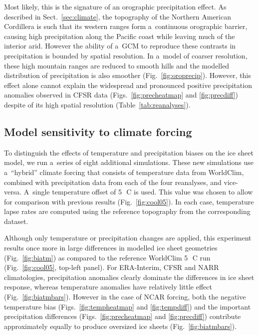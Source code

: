 \documentclass[tc, ms]{copernicus}
\begin{document}
Most likely, this is the signature of an orographic precipitation effect. As described in Sect.~\ref{sec:climate}, the topography of the Northern American Cordillera is such that its western ranges form a~continuous orographic barrier, causing high precipitation along the Pacific coast while leaving much of the interior arid. However the ability of a~GCM to reproduce these contrasts in precipitation is bounded by spatial resolution. In a~model of coarser resolution, these high mountain ranges are reduced to smooth hills and the modelled distribution of precipitation is also smoother (Fig.~\ref{fig:oroprecip}). However, this effect alone cannot explain the widespread and pronounced positive precipitation anomalies observed in CFSR data (Figs.~\ref{fig:precheatmap} and \ref{fig:precdiff}) despite of its high spatial resolution (Table~\ref{tab:reanalyses}).

\subsection{Model sensitivity to climate forcing}

To distinguish the effects of temperature and precipitation biases on the ice sheet model, we run a~series of eight additional simulations. These new simulations use a~“hybrid” climate forcing that consists of temperature data from WorldClim, combined with precipitation data from each of the four reanalyses, and vice-versa. A~single temperature offset of 5\,\unit{{\degree}C} is used. This value was chosen to allow for comparison with previous results (Fig.~\ref{fig:cool05}). In each case, temperature lapse rates are computed using the reference topography from the corresponding dataset.

Although only temperature or precipitation changes are applied, this experiment results once more in large differences in modelled ice sheet geometries (Fig.~\ref{fig:biatm}) as compared to the reference WorldClim 5\,\unit{{\degree}C} run (Fig.~\ref{fig:cool05}, top-left panel). For ERA-Interim, CFSR and NARR climatologies, precipitation anomalies clearly dominate the differences in ice sheet response, whereas temperature anomalies have relatively little effect (Fig.~\ref{fig:biatmbars}). However in the case of NCAR forcing, both the negative temperature bias (Figs.~\ref{fig:tempheatmap} and \ref{fig:tempdiff}) and the important precipitation differences (Figs.~\ref{fig:precheatmap} and \ref{fig:precdiff}) contribute approximately equally to produce oversized ice sheets (Fig.~\ref{fig:biatmbars}).
\end{document}
